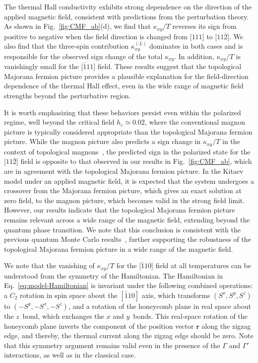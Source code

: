 \documentclass[twocolumn,superscriptaddress,showpacs, longbibliography, aps, prx]{revtex4-2}
\begin{document}
The thermal Hall conductivity exhibits strong dependence on the direction of the applied magnetic field, consistent with predictions from the perturbation theory.
As shown in Fig.~\ref{fig:CMF_ab}(d), we find that $\kappa_{xy}/T$ reverses its sign from positive to negative when the field direction is changed from [$111$] to  [$11\bar{2}$]. 
We also find that the three-spin contribution $\kappa_{xy}^{(L)}$ dominates in both cases and is responsible for the observed sign change of the total $\kappa_{xy}$.
In addition, $\kappa_{xy}/T$ is vanishingly small for the [$\bar{1}11$] field. 
These results suggest that the topological Majorana fermion picture provides a plausible explanation for the field-direction dependence of the thermal Hall effect, even in the wide range of magnetic field strengths beyond the perturbative region. 

It is worth emphasizing that these behaviors persist even within the polarized regime, well beyond the critical field $h_c \simeq 0.02$, where the conventional magnon picture is typically considered appropriate than the topological Majorana fermion picture. 
While the magnon picture also predicts a sign change in $\kappa_{xy}/T$ in the context of topological magnons~\cite{Joshi2018, ChernZK2021,ZhangCK2021}, the predicted sign in the polarized state for the [$11\bar{2}$] field is opposite to that observed in our results in Fig.~\ref{fig:CMF_ab}, which are in agreement with the topological Majorana fermion picture. 
In the Kitaev model under an applied magnetic field, it is expected that the system undergoes a crossover from the Majorana fermion picture, which gives an exact solution at zero field, to the magnon picture, which becomes valid in the strong field limit. 
However, our results indicate that the topological Majorana fermion picture remains relevant across a wide range of the magnetic field, extending beyond the quantum phase transition. 
We note that this conclusion is consistent with the previous quantum Monte Carlo results~\cite{YoshitakeNKM2020}, further supporting the robustness of the topological Majorana fermion picture in a wide range of the magnetic field.

We note that the vanishing of $\kappa_{xy}/T$ for the [$\bar{1}10$] field at all temperatures can be understood from the symmetry of the Hamiltonian.
The Hamiltonian in Eq.~\eqref{eq:model-Hamiltonian} is invariant under the following combined operations: 
a $C_2$ rotation in spin space about the $[\bar{1}10]$ axis, which transforms $(S^x,S^y,S^z)$ to $(-S^y,-S^x,-S^z)$, and a rotation of the honeycomb plane in real space about the $z$~bond, which exchanges the $x$ and $y$~bonds.
This real-space rotation of the honeycomb plane inverts the component of the position vector $\bm{r}$ along the zigzag edge, and thereby, the thermal current along the zigzag edge should be zero.
Note that this symmetry argument remains valid even in the presence of the $\Gamma$ and $\Gamma'$ interactions, as well as in the classical case.
\end{document}
